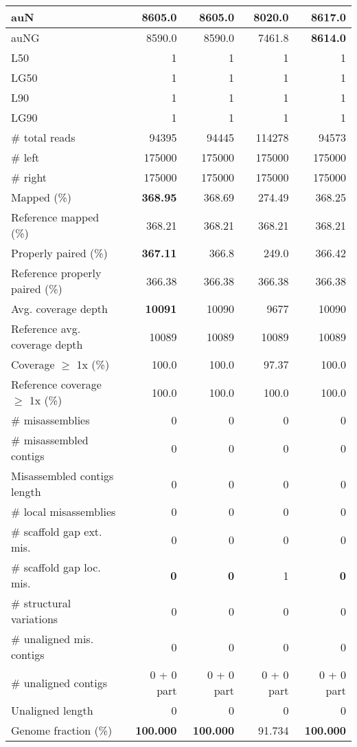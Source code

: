 \documentclass[12pt,a4paper]{article}
\begin{document}
\begin{table}[ht]
\begin{center}
\begin{tabular}{|l*{4}{|r}|}
auN & 8605.0 & 8605.0 & 8020.0 & {\bf 8617.0} \\ \hline
auNG & 8590.0 & 8590.0 & 7461.8 & {\bf 8614.0} \\ \hline
L50 & 1 & 1 & 1 & 1 \\ \hline
LG50 & 1 & 1 & 1 & 1 \\ \hline
L90 & 1 & 1 & 1 & 1 \\ \hline
LG90 & 1 & 1 & 1 & 1 \\ \hline
\# total reads & 94395 & 94445 & 114278 & 94573 \\ \hline
\# left & 175000 & 175000 & 175000 & 175000 \\ \hline
\# right & 175000 & 175000 & 175000 & 175000 \\ \hline
Mapped (\%) & {\bf 368.95} & 368.69 & 274.49 & 368.25 \\ \hline
Reference mapped (\%) & 368.21 & 368.21 & 368.21 & 368.21 \\ \hline
Properly paired (\%) & {\bf 367.11} & 366.8 & 249.0 & 366.42 \\ \hline
Reference properly paired (\%) & 366.38 & 366.38 & 366.38 & 366.38 \\ \hline
Avg. coverage depth & {\bf 10091} & 10090 & 9677 & 10090 \\ \hline
Reference avg. coverage depth & 10089 & 10089 & 10089 & 10089 \\ \hline
Coverage $\geq$ 1x (\%) & 100.0 & 100.0 & 97.37 & 100.0 \\ \hline
Reference coverage $\geq$ 1x (\%) & 100.0 & 100.0 & 100.0 & 100.0 \\ \hline
\# misassemblies & 0 & 0 & 0 & 0 \\ \hline
\# misassembled contigs & 0 & 0 & 0 & 0 \\ \hline
Misassembled contigs length & 0 & 0 & 0 & 0 \\ \hline
\# local misassemblies & 0 & 0 & 0 & 0 \\ \hline
\# scaffold gap ext. mis. & 0 & 0 & 0 & 0 \\ \hline
\# scaffold gap loc. mis. & {\bf 0} & {\bf 0} & 1 & {\bf 0} \\ \hline
\# structural variations & 0 & 0 & 0 & 0 \\ \hline
\# unaligned mis. contigs & 0 & 0 & 0 & 0 \\ \hline
\# unaligned contigs & 0 + 0 part & 0 + 0 part & 0 + 0 part & 0 + 0 part \\ \hline
Unaligned length & 0 & 0 & 0 & 0 \\ \hline
Genome fraction (\%) & {\bf 100.000} & {\bf 100.000} & 91.734 & {\bf 100.000} \\ \hline

\end{tabular}
\end{center}
\end{table}
\end{document}
